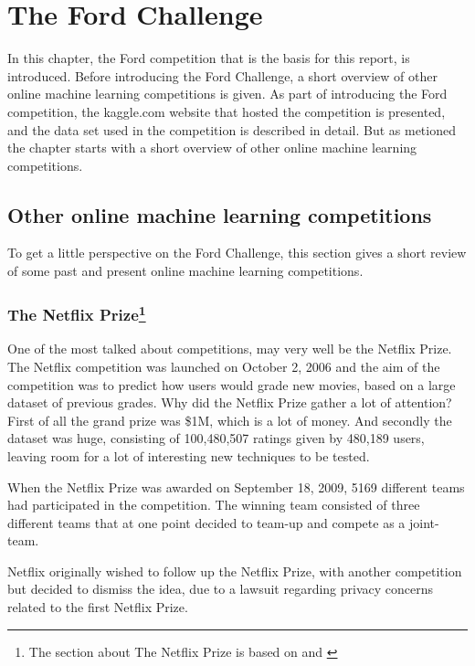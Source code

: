 \chapter{The Ford Challenge} 
In this chapter, the Ford competition that is the basis for this report, is introduced. Before introducing the Ford Challenge, a short overview of other online machine learning competitions is given. As part of introducing the Ford competition, the kaggle.com website that hosted the competition is presented, and the data set used in the competition is described in detail. But as metioned the chapter starts with a short overview of other online machine learning competitions.

\section{Other online machine learning competitions}
To get a little perspective on the Ford Challenge, this section gives a short review of some past and present online machine learning competitions.

\subsection[The Netflix Prize]{The Netflix Prize\protect\footnote{The section about The Netflix Prize is based on \citet{wiki:netflix_prize} and \citet{netflix_leaderboard}}}
One of the most talked about competitions, may very well be the Netflix Prize. The Netflix competition was launched on October 2, 2006 and the aim of the competition was to predict how users would grade new movies, based on a large dataset of previous grades. Why did the Netflix Prize gather a lot of attention? First of all the grand prize was \$1M, which is a lot of money. And secondly the dataset was huge, consisting of 100,480,507 ratings given by 480,189 users, leaving room for a lot of interesting new techniques to be tested. \par 
When the Netflix Prize was awarded on September 18, 2009, 5169 different teams had participated in the competition. The winning team consisted of three different teams that at one point decided to team-up and compete as a joint-team.\par 
Netflix originally wished to follow up the Netflix Prize, with another competition but decided to dismiss the idea, due to a lawsuit regarding privacy concerns related to the first Netflix Prize.

